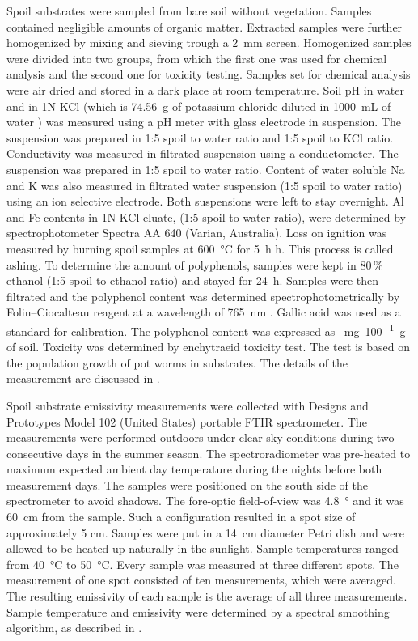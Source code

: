 \begin{appendices}
Spoil substrates were sampled from bare soil without vegetation. Samples contained negligible amounts of organic matter. Extracted samples were further homogenized by mixing and sieving trough a \SI{2}{\milli\meter} screen. Homogenized samples were divided into two groups, from which the first one was used for chemical analysis and the second one for toxicity testing. Samples set for chemical analysis were air dried and stored in a dark place at room temperature. Soil pH in water and in 1N KCl (which is \SI{74.56}{\gram} of potassium chloride diluted in \SI{1000}{\milli\liter} of water \cite{J03}) was measured using a pH meter with glass electrode in suspension. The suspension was prepared in 1:5 spoil to water ratio and 1:5 spoil to KCl ratio. Conductivity was measured in filtrated suspension using a conductometer. The suspension was prepared in 1:5 spoil to water ratio. Content of water soluble Na and K was also measured in filtrated water suspension (1:5 spoil to water ratio) using an ion selective electrode. Both suspensions were left to stay overnight. Al and Fe contents in 1N KCl eluate, (1:5 spoil to water ratio), were determined by spectrophotometer Spectra AA 640 (Varian, Australia). Loss on ignition was measured by burning spoil samples at \SI{600}{\celsius} for \SI{5}{\hour} h. This process is called ashing. To determine the amount of polyphenols, samples were kept in 80\,\% ethanol (1:5 spoil to ethanol ratio) and stayed for \SI{24}{\hour}. Samples were then filtrated and the polyphenol content was determined spectrophotometrically by Folin–Ciocalteau reagent at a wavelength of \SI{765}{\nano\meter} \cite{HL97}. Gallic acid was used as a standard for calibration. The polyphenol content was expressed as \SI{}{\milli\gram\per 100\gram} of soil. Toxicity was determined by enchytraeid toxicity test. The test is based on the population growth of pot worms in substrates. The details of the measurement are discussed in \cite{FK05}.

Spoil substrate emissivity measurements were collected with Designs and Prototypes Model 102 (United States) portable FTIR spectrometer. The measurements were performed outdoors under clear sky conditions during two consecutive days in the summer season. The spectroradiometer was pre-heated to maximum expected ambient day temperature during the nights before both measurement days. The samples were positioned on the south side of the spectrometer to avoid shadows. The fore-optic field-of-view was \SI{4.8}{\degree} and it was \SI{60}{\centi\meter} from the sample. Such a configuration resulted in a spot size of approximately 5 cm. Samples were put in a \SI{14}{\centi\meter} diameter Petri dish and were allowed to be heated up naturally in the sunlight. Sample temperatures ranged from \SI{40}{\celsius} to \SI{50}{\celsius}. Every sample was measured at three different spots. The measurement of one spot consisted of ten measurements, which were averaged. The resulting emissivity of each sample is the average of all three measurements. Sample temperature and emissivity were determined by a spectral smoothing algorithm, as described in \cite{HJ98}.


\end{appendices}
